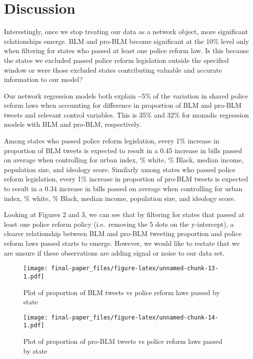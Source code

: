 \documentclass[12pt]{article}
\begin{document}
\hypertarget{discussion}{%
\section{Discussion}\label{discussion}}

Interestingly, once we stop treating our data as a network object, more
significant relationships emerge. BLM and pro-BLM become significant at
the 10\% level only when filtering for states who passed at least one
police reform law. Is this because the states we excluded passed police
reform legislation outside the specified window or were those excluded
states contributing valuable and accurate information to our model?

Our network regression models both explain \textasciitilde5\% of the
variation in shared police reform laws when accounting for difference in
proportion of BLM and pro-BLM tweets and relevant control variables.
This is 35\% and 32\% for monadic regression models with BLM and
pro-BLM, respectively.

Among states who passed police reform legislation, every 1\% increase in
proportion of BLM tweets is expected to result in a 0.45 increase in
bills passed on average when controlling for urban index, \% white, \%
Black, median income, population size, and ideology score. Similarly
among states who passed police reform legislation, every 1\% increase in
proportion of pro-BLM tweets is expected to result in a 0.34 increase in
bills passed on average when controlling for urban index, \% white, \%
Black, median income, population size, and ideology score.

Looking at Figures 2 and 3, we can see that by filtering for states that
passed at least one police reform policy (i.e.~removing the 5 dots on
the y-intercept), a clearer relationship between BLM and pro-BLM
tweeting proportion and police reform laws passed starts to emerge.
However, we would like to restate that we are unsure if these
observations are adding signal or noise to our data set.

\begin{figure}
\centering
\texttt{[image: final-paper\_files/figure-latex/unnamed-chunk-13-1.pdf]}
\caption{Plot of proportion of BLM tweets vs police reform laws passed
by state}
\end{figure}

\begin{figure}
\centering
\texttt{[image: final-paper\_files/figure-latex/unnamed-chunk-14-1.pdf]}
\caption{Plot of proportion of pro-BLM tweets vs police reform laws
passed by state}
\end{figure}
\end{document}
